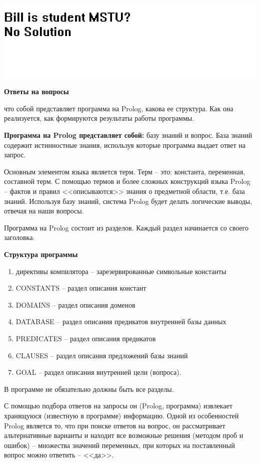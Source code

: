 \documentclass[a4paper,14pt]{extreport} %
\begin{document}
\begin{enumerate}
\includegraphics{ex3}

\end{enumerate}

\textbf{Ответы на вопросы}

что собой представляет программа на Prolog, какова ее структура. Как она реализуется, как формируются результаты работы программы. 

\textbf{Программа на Prolog представляет собой:} базу знаний и вопрос. База знаний содержит истинностные знания, используя которые программа выдает ответ на запрос. 

Основным элементом языка является терм. Терм – это: константа, переменная, составной терм. С помощью термов и более сложных конструкций языка Prolog – фактов и правил <<описываются>> знания о предметной области, т.е. база знаний. Используя базу знаний, система Prolog будет делать логические выводы, отвечая на наши вопросы. 

Программа на Prolog состоит из разделов. Каждый раздел начинается со своего заголовка. 

\textbf{Структура программы }
\begin{enumerate}
\item директивы компилятора -- зарезервированные символьные константы
\item CONSTANTS -- раздел описания констант
\item DOMAINS -- раздел описания доменов
\item DATABASE -- раздел описания предикатов внутренней базы данных
\item PREDICATES -- раздел описания предикатов
\item CLAUSES -- раздел описания предложений базы знаний
\item GOAL -- раздел описания внутренней цели (вопроса).
\end{enumerate}

В программе не обязательно должны быть все разделы.

С помощью подбора ответов на запросы он (Prolog, программа) извлекает хранящуюся (известную в программе) информацию. Одной из особенностей Prolog является то, что при поиске ответов на вопрос, он рассматривает альтернативные варианты и находит все возможные решения (методом проб и ошибок) -- множества значений переменных, при которых на поставленный вопрос можно ответить -- <<да>>.
\end{document}
